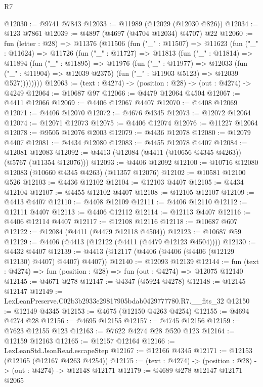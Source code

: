 \begin{lexlean}{R7}
\begin{coremodule}
@12030 := @9741 @7843
@12033 := @11989 (@12029 (@12030 @826))
@12034 := @123 @7861
@12039 := @4897 (@4697 (@4704 @12034) @4707) @22
@12060 := fun (letter : @28) =>
  @11376
    (@11506
      (fun ("_" : @11507) =>
      @11623
        (fun ("_" : @11624) =>
        @11726
          (fun ("_" : @11727) =>
          @11813
            (fun ("_" : @11814) =>
            @11894
              (fun ("_" : @11895) =>
              @11976
                (fun ("_" : @11977) =>
                @12033
                  (fun ("_" : @11904) => @12039 @2375)
                  (fun ("_" : @11903 @5123) => @12039 @527))))))))
@12063 := (text : @4274) -> (position : @28) -> (out : @4274) -> @4249
@12064 := @10687 @97
@12066 := @4479 @12064 @4504
@12067 := @4411 @12066
@12069 := @4406 @12067 @4407
@12070 := @4408 @12069
@12071 := @4406 @12070
@12072 := @4676 @4345
@12073 := @12072 @12064
@12074 := @12071 @12073
@12075 := @4406 @12074
@12076 := @11227 @12064
@12078 := @9505 @12076 @2003
@12079 := @4436 @12078
@12080 := @12079 @4407
@12081 := @4434 @12080
@12083 := @4455 @12078 @4407
@12084 := @12081 @12083
@12092 := @4413 (@12084 (@4411 (@10656 @4345 @4263)) (@5767 (@11354 @12076)))
@12093 := @4406 @12092
@12100 := @10716 @12080 @12083 (@10660 @4345 @4263) (@11357 @12076)
@12102 := @10581 @12100 @526
@12103 := @4436 @12102
@12104 := @12103 @4407
@12105 := @4434 @12104
@12107 := @4455 @12102 @4407
@12108 := @12105 @12107
@12109 := @4413 @4407
@12110 := @4408 @12109
@12111 := @4406 @12110
@12112 := @12111 @4407
@12113 := @4406 @12112
@12114 := @12113 @4407
@12116 := @4406 @12114 @4407
@12117 := @12108 @12116
@12118 := @10687 @607
@12122 := @12084 (@4411 (@4479 @12118 @4504))
@12123 := @10687 @59
@12129 := @4406 (@4413 (@12122 (@4411 (@4479 @12123 @4504))))
@12130 := @4432 @4407
@12139 := @4413 (@12117 (@4406 (@4406 (@4406 (@12129 @12130) @4407) @4407) @4407))
@12140 := @12093 @12139
@12144 := fun (text : @4274) => fun (position : @28) => fun (out : @4274) => @12075 @12140
@12145 := @4671 @278
@12147 := @4347 (@5924 @4278)
@12148 := @12145 @12147
@12149 := LexLeanPreserve.C02b3b2933e29817905bdab0429777780.R7.__fits_32
@12150 := @12149 @4345
@12153 := @4675 (@12150 @4263 @4254)
@12155 := @4694 @4274 @28
@12156 := @4695 @12155
@12157 := @4745 @12156
@12159 := @7623 @12155 @123
@12163 := @7622 @4274 @28 @520 @123
@12164 := @12159 @12163
@12165 := @12157 @12164
@12166 := LexLeanStd.JsonRead.escapeStep
@12167 := @12166 @4345
@12171 := @12153 (@12165 (@12167 @4263 @4254))
@12175 := (text : @4274) -> (position : @28) -> (out : @4274) -> @12148 @12171
@12179 := @4689 @278 @12147 @12171 @2065

\end{coremodule}
\end{lexlean}
